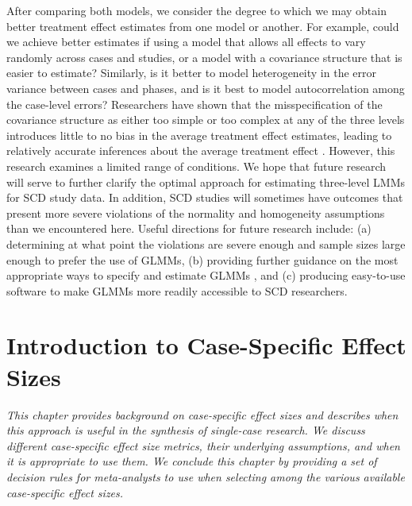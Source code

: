 \documentclass[
]{book}
\begin{document}
After comparing both models, we consider the degree to which we may obtain better treatment effect estimates from one model or another. For example, could we achieve better estimates if using a model that allows all effects to vary randomly across cases and studies, or a model with a covariance structure that is easier to estimate? Similarly, is it better to model heterogeneity in the error variance between cases and phases, and is it best to model autocorrelation among the case-level errors? Researchers have shown that the misspecification of the covariance structure as either too simple or too complex at any of the three levels introduces little to no bias in the average treatment effect estimates, leading to relatively accurate inferences about the average treatment effect \citep{baek_Ferron_2020, Joo_Ferron_2019, Moeyaert_Ugille_Ferron_Beretvas_VandenNoortgate_2013, Moeyaert_Ugille_Ferron_Beretvas_VanDenNoortgate_2016, Petit-Bois_2014, Petit-Bois_Baek_VandenNoortgate_Beretvas_Ferron_2016}. However, this research examines a limited range of conditions. We hope that future research will serve to further clarify the optimal approach for estimating three-level LMMs for SCD study data. In addition, SCD studies will sometimes have outcomes that present more severe violations of the normality and homogeneity assumptions than we encountered here. Useful directions for future research include: (a) determining at what point the violations are severe enough and sample sizes large enough to prefer the use of GLMMs, (b) providing further guidance on the most appropriate ways to specify and estimate GLMMs \citep{Li_Luo_Baek_Thompson_Lam_2023}, and (c) producing easy-to-use software to make GLMMs more readily accessible to SCD researchers.

\hypertarget{intro-case-specific-es}{%
\chapter{Introduction to Case-Specific Effect Sizes}\label{intro-case-specific-es}}

\emph{This chapter provides background on case-specific effect sizes and describes when this approach is useful in the synthesis of single-case research. We discuss different case-specific effect size metrics, their underlying assumptions, and when it is appropriate to use them. We conclude this chapter by providing a set of decision rules for meta-analysts to use when selecting among the various available case-specific effect sizes.}
\end{document}
